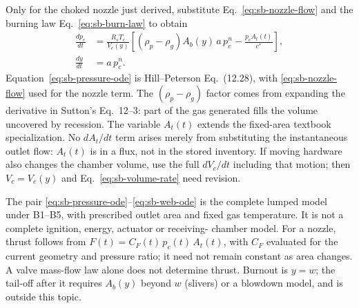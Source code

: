 Only for the choked nozzle just derived, substitute
Eq.~\eqref{eq:sb-nozzle-flow} and the burning law
Eq.~\eqref{eq:sb-burn-law} to obtain
\begin{align}
 \frac{dp_c}{dt}&=\frac{R_sT_c}{V_c(y)}
   \left[(\rho_p-\rho_g)A_b(y)\,a\,p_c^n-\frac{p_cA_t(t)}{c^*}\right],
   \label{eq:sb-pressure-ode}\\
 \frac{dy}{dt}&=a\,p_c^n .\label{eq:sb-web-ode}
\end{align}
Equation~\eqref{eq:sb-pressure-ode} is Hill--Peterson Eq.~(12.28), with
\eqref{eq:sb-nozzle-flow} used for the nozzle term. The $(\rho_p-\rho_g)$
factor comes from expanding the derivative in Sutton's Eq.~12--3:
part of the gas generated fills the volume uncovered by recession.
The variable $A_t(t)$ extends the fixed-area textbook specialization.
No $dA_t/dt$ term arises merely from substituting the instantaneous outlet
flow: $A_t(t)$ is in a flux, not in the stored inventory. If moving hardware
also changes the chamber volume, use the full $dV_c/dt$ including that
motion; then $V_c=V_c(y)$ and Eq.~\eqref{eq:sb-volume-rate} need revision.

The pair \eqref{eq:sb-pressure-ode}--\eqref{eq:sb-web-ode} is the complete
lumped model under B1--B5, with prescribed outlet area and fixed gas
temperature. It is not a complete ignition, energy, actuator or receiving-
chamber model. For a nozzle, thrust follows from
$F(t)=C_F(t)\,p_c(t)\,A_t(t)$, with $C_F$ evaluated for the current
geometry and pressure ratio; it need not remain constant as area changes.
A valve mass-flow law alone does not determine thrust. Burnout is
$y=w$; the tail-off after it requires $A_b(y)$ beyond $w$ (slivers) or a
blowdown model, and is outside this topic.

